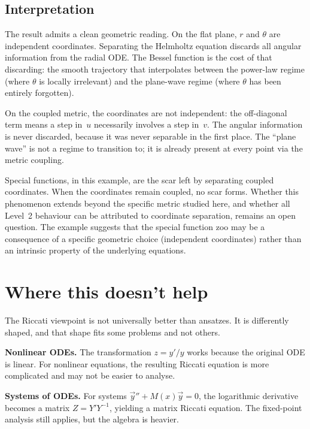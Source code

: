 \documentclass{amsart}
\theoremstyle{definition}
\theoremstyle{remark}
\begin{document}
\subsection{Interpretation}

The result admits a clean geometric reading. On the flat plane, $r$ and $\theta$ are independent coordinates. Separating the Helmholtz equation discards all angular information from the radial ODE. The Bessel function is the cost of that discarding: the smooth trajectory that interpolates between the power-law regime (where $\theta$ is locally irrelevant) and the plane-wave regime (where $\theta$ has been entirely forgotten).

On the coupled metric, the coordinates are not independent: the off-diagonal term means a step in~$u$ necessarily involves a step in~$v$. The angular information is never discarded, because it was never separable in the first place. The ``plane wave'' is not a regime to transition to; it is already present at every point via the metric coupling.

Special functions, in this example, are the scar left by separating coupled coordinates. When the coordinates remain coupled, no scar forms. Whether this phenomenon extends beyond the specific metric studied here, and whether all Level~2 behaviour can be attributed to coordinate separation, remains an open question. The example suggests that the special function zoo may be a consequence of a specific geometric choice (independent coordinates) rather than an intrinsic property of the underlying equations.

\section{Where this doesn't help}

The Riccati viewpoint is not universally better than ansatzes. It is differently shaped, and that shape fits some problems and not others.

\textbf{Nonlinear ODEs.} The transformation $z = y'/y$ works because the original ODE is linear. For nonlinear equations, the resulting Riccati equation is more complicated and may not be easier to analyse.

\textbf{Systems of ODEs.} For systems $\vec{y}'' + M(x)\vec{y} = 0$, the logarithmic derivative becomes a matrix $Z = Y'Y^{-1}$, yielding a matrix Riccati equation. The fixed-point analysis still applies, but the algebra is heavier.
\end{document}
